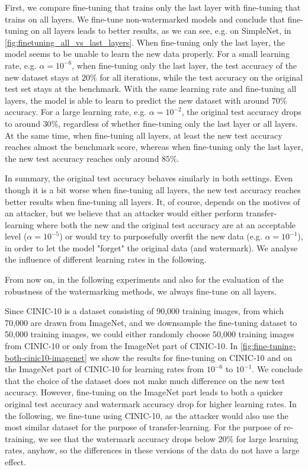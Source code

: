 

First, we compare fine-tuning that trains only the last layer with fine-tuning that trains on all layers. We fine-tune non-watermarked models and conclude that fine-tuning on all layers leads to better results, as we can see, e.g. on SimpleNet, in \cref{fig:finetuning_all_vs_last_layers}. When fine-tuning only the last layer, the model seems to be unable to learn the new data properly. For a small learning rate, e.g. $\alpha=10^{-6}$, when fine-tuning only the last layer, the test accuracy of the new dataset stays at $20\%$ for all iterations, while the test accuracy on the original test set stays at the benchmark. With the same learning rate and fine-tuning all layers, the model is able to learn to predict the new dataset with around $70\%$ accuracy. For a large learning rate, e.g. $\alpha=10^{-2}$, the original test accuracy drops to around $30\%$, regardless of whether fine-tuning only the last layer or all layers. At the same time, when fine-tuning all layers, at least the new test accuracy reaches almost the benchmark score, whereas when fine-tuning only the last layer, the new test accuracy reaches only around $85\%$.

In summary, the original test accuracy behaves similarly in both settings. Even though it is a bit worse when fine-tuning all layers, the new test accuracy reaches better results when fine-tuning all layers. It, of course, depends on the motives of an attacker, but we believe that an attacker would either perform transfer-learning where both the new and the original test accuracy are at an acceptable level ($\alpha=10^{-5}$) or would try to purposefully overfit the new data (e.g. $\alpha=10^{-1}$), in order to let the model "forget" the original data (and watermark). We analyse the influence of different learning rates in the following.

From now on, in the following experiments and also for the evaluation of the robustness of the watermarking methods, we always fine-tune on all layers.



Since CINIC-10 is a dataset consisting of 90,000 training images, from which 70,000 are drawn from ImageNet, and we downsample the fine-tuning dataset to 50,000 training images, we could either randomly choose 50,000 training images from CINIC-10 or only from the ImageNet part of CINIC-10. In \cref{fig:fine-tuning-both-cinic10-imagenet} we show the results for fine-tuning on CINIC-10 and on the ImageNet part of CINIC-10 for learning rates from $10^{-6}$ to $10^{-1}$. We conclude that the choice of the dataset does not make much difference on the new test accuracy. However, fine-tuning on the ImageNet part leads to both a quicker original test accuracy and watermark accuracy drop for higher learning rates. In the following, we fine-tune using CINIC-10, as the attacker would also use the most similar dataset for the purpose of transfer-learning. For the purpose of re-training, we see that the watermark accuracy drops below 20\% for large learning rates, anyhow, so the differences in these versions of the data do not have a large effect.

